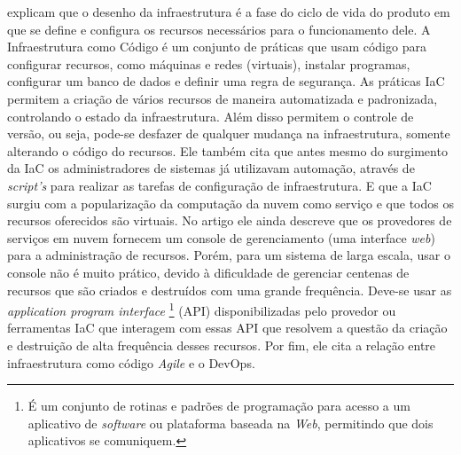  explicam que o desenho da infraestrutura é a fase do ciclo de vida do produto em que se define e configura os recursos necessários para o funcionamento dele. A Infraestrutura como Código é um conjunto de práticas que usam código para configurar recursos, como máquinas e redes (virtuais), instalar programas, configurar um banco de dados e definir uma regra de segurança. As práticas IaC permitem a criação de vários recursos de maneira automatizada e padronizada, controlando o estado da infraestrutura. Além disso permitem o controle de versão, ou seja, pode-se desfazer de qualquer mudança na infraestrutura, somente alterando o código do recursos. Ele também cita que antes mesmo do surgimento da IaC os administradores de sistemas já utilizavam automação, através de \textit{script's} para realizar as tarefas de configuração de infraestrutura. E que a IaC surgiu com a popularização da computação da nuvem como serviço e que todos os recursos oferecidos são virtuais. No artigo ele ainda descreve que os provedores de serviços em nuvem fornecem um console de gerenciamento (uma interface \textit{web}) para a administração de recursos. Porém, para um sistema de larga escala, usar o console não é muito prático, devido à dificuldade de gerenciar centenas de recursos que são criados e destruídos com uma grande frequência. Deve-se usar as \textit{application program interface} \footnote{É um conjunto de rotinas e padrões de programação para acesso a um aplicativo de \textit{software} ou plataforma baseada na \textit{Web}, permitindo que dois aplicativos se comuniquem. } (API) disponibilizadas pelo provedor ou ferramentas IaC que interagem com essas API que resolvem a questão da criação e destruição de alta frequência desses recursos. Por fim, ele cita a relação entre infraestrutura como código \textit{Agile} e o DevOps. 

\hfill

